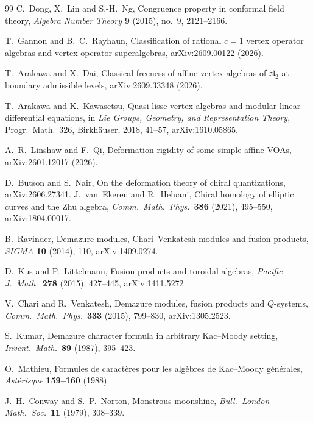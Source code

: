 \documentclass[10pt]{article}
\newcommand{\sltwo}{\mathfrak{sl}_2}
\begin{document}
\begin{thebibliography}{99}
  C.~Dong, X.~Lin and S.-H.~Ng, Congruence property in conformal field theory, \emph{Algebra Number Theory}
  \textbf{9} (2015), no.~9, 2121--2166.

  T.~Gannon and B.~C.~Rayhaun, Classification of rational $c=1$ vertex operator algebras and vertex operator
  superalgebras, arXiv:2609.00122 (2026).

  T.~Arakawa and X.~Dai, Classical freeness of affine vertex algebras of $\sltwo$ at boundary admissible levels,
  arXiv:2609.33348 (2026).

  T.~Arakawa and K.~Kawasetsu, Quasi-lisse vertex algebras and modular linear differential equations, in \emph{Lie
  Groups, Geometry, and Representation Theory}, Progr.\ Math.~326, Birkh\"auser, 2018, 41--57, arXiv:1610.05865.

  A.~R.~Linshaw and F.~Qi, Deformation rigidity of some simple affine VOAs, arXiv:2601.12017 (2026).

  D.~Butson and S.~Nair, On the deformation theory of chiral quantizations, arXiv:2606.27341.
  J.~van~Ekeren and R.~Heluani, Chiral homology of elliptic curves and the Zhu algebra, \emph{Comm.\ Math.\ Phys.}\
  \textbf{386} (2021), 495--550, arXiv:1804.00017.

  B.~Ravinder, Demazure modules, Chari--Venkatesh modules and fusion products, \emph{SIGMA} \textbf{10} (2014), 110,
  arXiv:1409.0274.

  D.~Kus and P.~Littelmann, Fusion products and toroidal algebras, \emph{Pacific J.\ Math.}\ \textbf{278} (2015),
  427--445, arXiv:1411.5272.

  V.~Chari and R.~Venkatesh, Demazure modules, fusion products and $Q$-systems, \emph{Comm.\ Math.\ Phys.}\ \textbf{333}
  (2015), 799--830, arXiv:1305.2523.

  S.~Kumar, Demazure character formula in arbitrary Kac--Moody setting, \emph{Invent.\ Math.}\ \textbf{89} (1987),
  395--423.

  O.~Mathieu, Formules de caract\`eres pour les alg\`ebres de Kac--Moody g\'en\'erales, \emph{Ast\'erisque}
  \textbf{159--160} (1988).

  J.~H.~Conway and S.~P.~Norton, Monstrous moonshine, \emph{Bull.\ London Math.\ Soc.}\ \textbf{11} (1979), 308--339.


\end{thebibliography}
\end{document}
